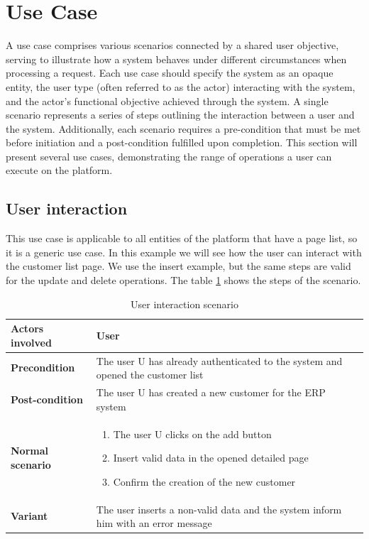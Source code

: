\section{Use Case}
A use case comprises various scenarios connected by a shared user objective, serving to illustrate
how a system behaves under different circumstances when processing a request. Each use case should
specify the system as an opaque entity, the user type (often referred to as the actor) interacting
with the system, and the actor's functional objective achieved through the system. A single scenario
represents a series of steps outlining the interaction between a user and the system. Additionally,
each scenario requires a pre-condition that must be met before initiation and a post-condition
fulfilled upon completion. This section will present several use cases, demonstrating the range of
operations a user can execute on the platform.

\subsection{User interaction}
This use case is applicable to all entities of the platform that have a page list, so it is a
generic use case. In this example we will see how the user can interact with the customer list page.
We use the insert example, but the same steps are valid for the update and delete operations. The
table \ref{tab:5_user_interaction} shows the steps of the scenario.

\begin{table}
    \centering
    \begin{tabular}{|l|p{10cm}|}
        \hline
        \textbf{Actors involved} & User                                                                              \\
        \hline
        \textbf{Precondition}    & The user U has already authenticated to the system and opened the customer list   \\
        \hline
        \textbf{Post-condition}  & The user U has created a new customer for the ERP system                          \\
        \hline
        \textbf{Normal scenario} &
        \begin{enumerate}
            \item The user U clicks on the add button
            \item Insert valid data in the opened detailed page
            \item Confirm the creation of the new customer
        \end{enumerate}                                                           \\
        \hline
        \textbf{Variant}         & The user inserts a non-valid data and the system inform him with an error message \\
        \hline
    \end{tabular}
    \caption{User interaction scenario}
    \label{tab:5_user_interaction}
\end{table}


